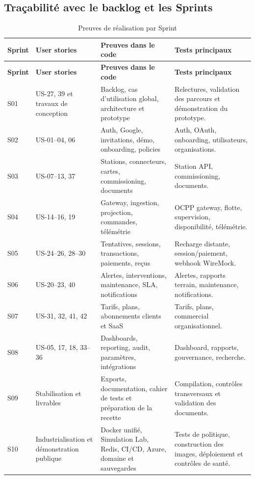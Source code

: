 \subsection{Traçabilité avec le backlog et les Sprints}

\begin{longtable}{|C{1.5cm}|p{3.3cm}|p{4.5cm}|p{4.0cm}|}
  \caption{Preuves de réalisation par Sprint}
  \label{tab:implementation-traceability}\\
  \hline
  \textbf{Sprint} & \textbf{User stories} & \textbf{Preuves dans le code} &
  \textbf{Tests principaux}\\
  \hline
  \endfirsthead
  \hline
  \textbf{Sprint} & \textbf{User stories} & \textbf{Preuves dans le code} &
  \textbf{Tests principaux}\\
  \hline
  \endhead
  S01 & US-27, 39 et travaux de conception &
  Backlog, cas d'utilisation global, architecture et prototype &
  Relectures, validation des parcours et démonstration du prototype.\\\hline
  S02 & US-01--04, 06 &
  Auth, Google, invitations, démo, onboarding, policies &
  Auth, OAuth, onboarding, utilisateurs, organisations.\\\hline
  S03 & US-07--13, 37 &
  Stations, connecteurs, cartes, commissioning, documents &
  Station API, commissioning, documents.\\\hline
  S04 & US-14--16, 19 &
  Gateway, ingestion, projection, commandes, télémétrie &
  OCPP gateway, flotte, supervision, disponibilité, télémétrie.\\\hline
  S05 & US-24--26, 28--30 &
  Tentatives, sessions, transactions, paiements, reçus &
  Recharge distante, session/paiement, webhook WireMock.\\\hline
  S06 & US-20--23, 40 &
  Alertes, interventions, maintenance, SLA, notifications &
  Alertes, rapports terrain, maintenance, notifications.\\\hline
  S07 & US-31, 32, 41, 42 &
  Tarifs, plans, abonnements clients et SaaS &
  Tarifs, plans, commercial organisationnel.\\\hline
  S08 & US-05, 17, 18, 33--36 &
  Dashboards, reporting, audit, paramètres, intégrations &
  Dashboard, rapports, gouvernance, recherche.\\\hline
  S09 & Stabilisation et livrables &
  Exports, documentation, cahier de tests et préparation de la recette &
  Compilation, contrôles transversaux et validation des documents.\\\hline
  S10 & Industrialisation et démonstration publique &
  Docker unifié, Simulation Lab, Redis, CI/CD, Azure, domaine et sauvegardes &
  Tests de politique, construction des images, déploiement et contrôles de santé.\\
  \hline
\end{longtable}


